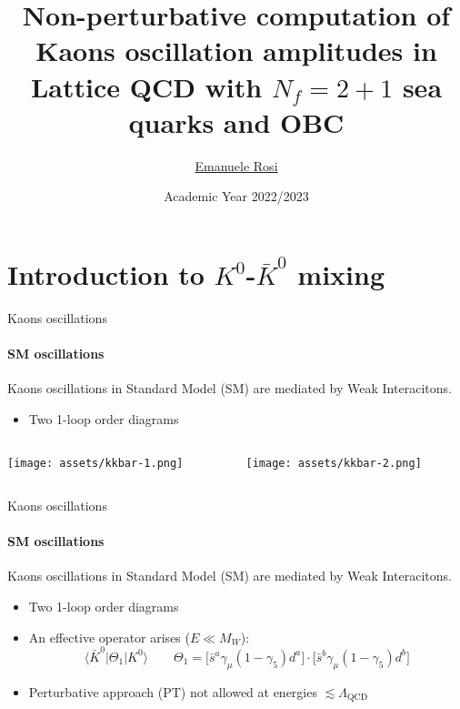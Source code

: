 \documentclass{beamer}
\title{Non-perturbative computation of Kaons oscillation amplitudes in Lattice QCD with $N_f = 2+1$ sea quarks and OBC}
\author{\href{mailto:emanuele.rosi@roma1.infn.it}{Emanuele Rosi}}
\date{Academic Year 2022/2023}
\newcommand{\la}{\langle}
\newcommand{\ra}{\rangle}
\begin{document}
\maketitle

\section{Introduction to $K^0$-$\bar K^0$ mixing}

\begin{frame}{Kaons oscillations}
      \framesubtitle{SM oscillations}
      Kaons oscillations in Standard Model (SM) are mediated by Weak Interacitons.
      \begin{itemize}
            \item Two 1-loop order diagrams
      \end{itemize}
      \vspace{\baselineskip}
      \begin{columns}
            \centering
            \begin{column}{0.5\textwidth}
                  \centering
                  \texttt{[image: assets/kkbar-1.png]}
            \end{column}
            \begin{column}{0.5\textwidth}
                  \centering
                  \texttt{[image: assets/kkbar-2.png]}
            \end{column}
      \end{columns}
\end{frame}

\begin{frame}{Kaons oscillations}
      \framesubtitle{SM oscillations}
      Kaons oscillations in Standard Model (SM) are mediated by Weak Interacitons.
      \begin{itemize}
            \item Two 1-loop order diagrams
            \item An effective operator arises ($E \ll M_W$):
            \begin{equation*}
                  \la \bar K^0 | \Theta_1 | K^0 \ra \qquad \Theta_1 = \Big[ \bar s^a \gamma_\mu (1-\gamma_5) d^a \Big] \cdot \Big[ \bar s^b \gamma_\mu (1-\gamma_5) d^b \Big]
            \end{equation*}
            \item Perturbative approach (PT) not allowed at energies $\lesssim \Lambda_\text{QCD}$
      \end{itemize}
\end{frame}
\end{document}
